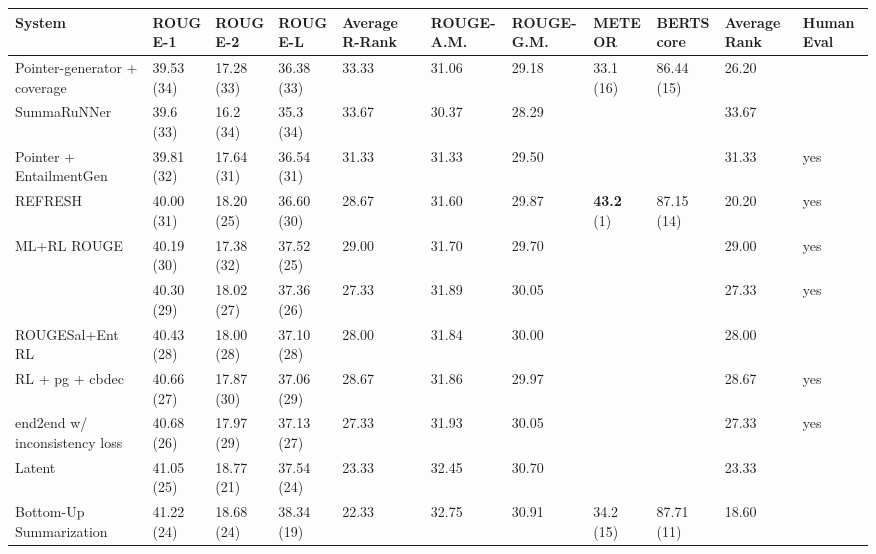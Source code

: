 \documentclass[11pt]{article}
\theoremstyle{remark}
\begin{document}
\begin{landscape}
\begin{table}[t]
\scriptsize
\centering
\begin{tabularx}{\linewidth}{Xllllllllll}
\hline
System          & ROUGE-1    & ROUGE-2   & ROUGE-L   & Average R-Rank & ROUGE-A.M. & ROUGE-G.M. & METEOR   & BERTScore   & Average Rank & Human Eval \\
\hline
Pointer-generator   + coverage ~\citealp{see-etal-2017-get} & 39.53 (34) & 17.28 (33) & 36.38 (33) & 33.33 & 31.06 & 29.18 & 33.1 (16) & 86.44 (15) & 26.20 &     \\
SummaRuNNer                    ~\citealp{nallapati2017summarunner} & 39.6  (33) & 16.2  (34) & 35.3  (34) & 33.67 & 30.37 & 28.29 &          &           & 33.67 &     \\
Pointer + EntailmentGen        ~\citealp{guo-etal-2018-soft} & 39.81 (32) & 17.64 (31) & 36.54 (31) & 31.33 & 31.33 & 29.50 &          &           & 31.33 & yes \\
REFRESH                        ~\citealp{narayan-etal-2018-ranking} & 40.00 (31) & 18.20 (25) & 36.60 (30) & 28.67 & 31.60 & 29.87 & \textbf{43.2} (1) & 87.15 (14) & 20.20 & yes \\
ML+RL ROUGE                    ~\citealp{kryscinski-etal-2018-improving} & 40.19 (30) & 17.38 (32) & 37.52 (25) & 29.00 & 31.70 & 29.70 &          &           & 29.00 & yes \\
                               ~\citealp{li-etal-2018-improving-neural} & 40.30 (29) & 18.02 (27) & 37.36 (26) & 27.33 & 31.89 & 30.05 &          &           & 27.33 & yes \\
ROUGESal+Ent RL                ~\citealp{pasunuru-bansal-2018-multi} & 40.43 (28) & 18.00 (28) & 37.10 (28) & 28.00 & 31.84 & 30.00 &          &           & 28.00 &     \\
RL + pg + cbdec                ~\citealp{jiang-bansal-2018-closed} & 40.66 (27) & 17.87 (30) & 37.06 (29) & 28.67 & 31.86 & 29.97 &          &           & 28.67 & yes \\
end2end w/ inconsistency loss  ~\citealp{hsu-etal-2018-unified} & 40.68 (26) & 17.97 (29) & 37.13 (27) & 27.33 & 31.93 & 30.05 &          &           & 27.33 & yes \\
Latent                         ~\citealp{zhang-etal-2018-neural} & 41.05 (25) & 18.77 (21) & 37.54 (24) & 23.33 & 32.45 & 30.70 &          &           & 23.33 &     \\
Bottom-Up Summarization        ~\citealp{gehrmann-etal-2018-bottom} & 41.22 (24) & 18.68 (24) & 38.34 (19) & 22.33 & 32.75 & 30.91 & 34.2 (15) & 87.71 (11) & 18.60 &     \\

\end{tabularx}
\end{table}
\end{landscape}
\end{document}
